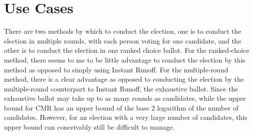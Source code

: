 \documentclass{article}
\begin{document}
\section{Use Cases}
There are two methods by which to conduct the election, one is to conduct the election in multiple rounds, with each person voting for one candidate, and the other is to conduct the election in one ranked choice ballot. For the ranked-choice method, there seems to me to be little advantage to conduct the election by this method as opposed to simply using Instant Runoff. For the multiple-round method, there is a clear advantage as opposed to conducting the election by the multiple-round counterpart to Instant Runoff, the exhaustive ballot. Since the exhaustive ballot may take up to as many rounds as candidates, while the upper bound for CMR has an upper bound of the base 2 logarithm of the number of candidates. However, for an election with a very large number of candidates, this upper bound can conceivably still be difficult to manage.
\end{document}
